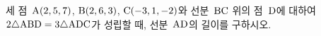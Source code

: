 세 점~$\mathrm{A}(2{,}\mkern3mu\mathopen{}5{,}\mkern3mu\mathopen{}7)$, $\mathrm{B}(2{,}\mkern3mu\mathopen{}6{,}\mkern3mu\mathopen{}3)$, $\mathrm{C}(-3{,}\mkern3mu\mathopen{}1{,}\mkern3mu\mathopen{}-2)$와 선분~$\mathrm{BC}$ 위의 점~$\mathrm{D}$에 대하여 $2\triangle\mathrm{ABD}=3\triangle\mathrm{ADC}$가 성립할 때, 선분~$\mathrm{AD}$의 길이를 구하시오.
